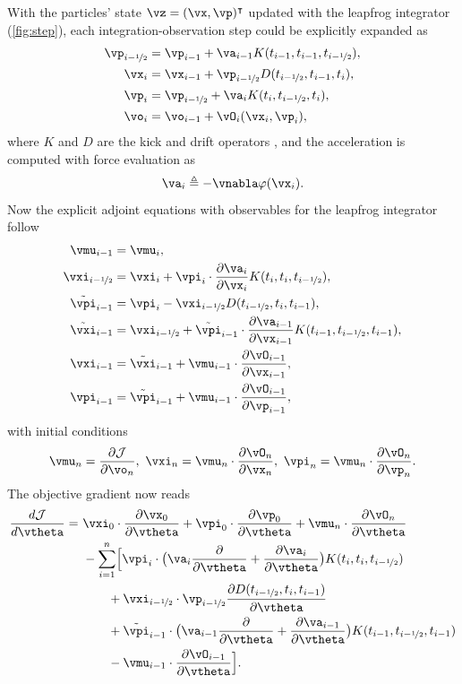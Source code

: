 \documentclass[modern, trackchanges, dvipsnames]{aastex631}
\renewcommand{\d}{d}
\newcommand{\p}{\partial}
\newcommand{\cJ}{\mathcal{J}}
\newcommand{\half}{\nicefrac12}
\begin{document}
With the particles' state $\vz = (\vx, \vp)^\intercal$ updated with the
leapfrog integrator (\autoref{fig:step}), each integration-observation
step could be explicitly expanded as
\begin{align}
\vp_{i-\half} &= \vp_{i-1} + \va_{i-1} K(t_{i-1}, t_{i-1}, t_{i-\half}), \nonumber\\
\vx_i &= \vx_{i-1} + \vp_{i-\half} D(t_{i-\half}, t_{i-1}, t_i), \nonumber\\
\vp_i &= \vp_{i-\half} + \va_i K(t_i, t_{i-\half}, t_i), \nonumber\\
\vo_i &= \vo_{i-1} + \vO_i(\vx_i, \vp_i),
\label{KDKO}
\end{align}
where $K$ and $D$ are the kick and drift operators \citep{Li2022a}, and
the acceleration is computed with force evaluation as
\begin{equation}
\va_i \triangleq -\vnabla\varphi(\vx_i).
\end{equation}
Now the explicit adjoint equations with observables for the leapfrog
integrator follow
\begin{align}
\vmu_{i-1} &= \vmu_i, \nonumber\\
\vxi_{i-\half} &= \vxi_i + \vpi_i \cdot \frac{\p\va_i}{\p\vx_i} K(t_i, t_i, t_{i-\half}), \nonumber\\
\tilde{\vpi}_{i-1} &= \vpi_i - \vxi_{i-\half} D(t_{i-\half}, t_i, t_{i-1}), \nonumber\\
\tilde{\vxi}_{i-1} &= \vxi_{i-\half} + \tilde{\vpi}_{i-1} \cdot \frac{\p\va_{i-1}}{\p\vx_{i-1}} K(t_{i-1}, t_{i-\half}, t_{i-1}), \nonumber\\
\vxi_{i-1} &= \tilde{\vxi}_{i-1} + \vmu_{i-1}\cdot\frac{\p\vO_{i-1}}{\p\vx_{i-1}}, \nonumber\\
\vpi_{i-1} &= \tilde{\vpi}_{i-1} + \vmu_{i-1}\cdot\frac{\p\vO_{i-1}}{\p\vp_{i-1}},
\label{KDKO_adj}
\end{align}
with initial conditions
\begin{equation}
\vmu_n = \frac{\p\cJ}{\p\vo_n},\
\vxi_n = \vmu_n \cdot \frac{\p\vO_n}{\p\vx_n},\
\vpi_n = \vmu_n \cdot \frac{\p\vO_n}{\p\vp_n}.
\label{KDKO_adj_init}
\end{equation}
The objective gradient now reads
\begin{align}
\frac{\d\cJ}{\d\vtheta} =\
& \vxi_0 \cdot \frac{\p\vx_0}{\p\vtheta}
+ \vpi_0 \cdot \frac{\p\vp_0}{\p\vtheta}
+ \vmu_{n}\cdot\frac{\p\vO_{n}}{\p\vtheta} \nonumber\\
& - \sum_{i=1}^n \Bigl[
  \vpi_i\cdot\bigl(\va_i \frac\p{\p\vtheta} + \frac{\p\va_i}{\p\vtheta}
    \bigr) K(t_i, t_i, t_{i-\half}) \nonumber\\
  &\qquad + \vxi_{i-\half} \cdot \vp_{i-\half}
    \frac{\p D(t_{i-\half}, t_i, t_{i-1})}{\p\vtheta} \nonumber\\
  &\qquad + \tilde{\vpi}_{i-1}\cdot\bigl(\va_{i-1} \frac\p{\p\vtheta}
    + \frac{\p\va_{i-1}}{\p\vtheta} \bigr) K(t_{i-1}, t_{i-\half}, t_{i-1}) \nonumber\\
  &\qquad - \vmu_{i-1}\cdot\frac{\p\vO_{i-1}}{\p\vtheta}
\Bigr].
\label{KDKO_grad}
\end{align}
\end{document}
